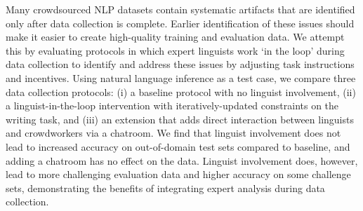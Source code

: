 Many crowdsourced NLP datasets contain systematic artifacts that are identified only after data collection is complete. Earlier identification of these issues should make it easier to create high-quality training and evaluation data. We attempt this by evaluating protocols in which expert linguists work ‘in the loop’ during data collection to identify and address these issues by adjusting task instructions and incentives. Using natural language inference as a test case, we compare three data collection protocols: (i) a baseline protocol with no linguist involvement, (ii) a linguist-in-the-loop intervention with iteratively-updated constraints on the writing task, and (iii) an extension that adds direct interaction between linguists and crowdworkers via a chatroom. We find that linguist involvement does not lead to increased accuracy on out-of-domain test sets compared to baseline, and adding a chatroom has no effect on the data. Linguist involvement does, however, lead to more challenging evaluation data and higher accuracy on some challenge sets, demonstrating the benefits of integrating expert analysis during data collection.
